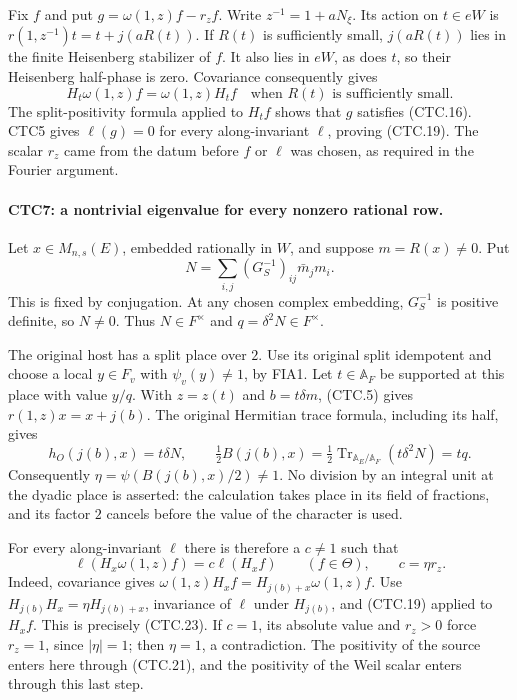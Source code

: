 Fix $f$ and put $g=\omega(1,z)f-r_zf$.  Write
$z^{-1}=1+aN_\xi$.  Its action on $t\in eW$ is
$r(1,z^{-1})t=t+j(aR(t))$.  If $R(t)$ is sufficiently small,
$j(aR(t))$ lies in the finite Heisenberg stabilizer of $f$.
It also lies in $eW$, as does $t$, so their Heisenberg half-phase
is zero.  Covariance consequently gives
\[
 H_t\omega(1,z)f=\omega(1,z)H_tf
                  \quad\text{when }R(t)\text{ is sufficiently small}.
 \tag{CTC.20}
\]
The split-positivity formula applied to $H_tf$ shows that $g$
satisfies (CTC.16).  CTC5 gives $\ell(g)=0$ for every along-invariant
$\ell$, proving (CTC.19).  The scalar $r_z$ came from the datum
before $f$ or $\ell$ was chosen, as required in the Fourier argument.

\paragraph{CTC7: a nontrivial eigenvalue for every nonzero rational row.}
\label{claim:CTC7}
Let $x\in M_{n,s}(E)$, embedded rationally in $W$, and suppose
$m=R(x)\ne0$.  Put
\[
                    N=\sum_{i,j}(G_S^{-1})_{ij}\bar m_jm_i.
 \tag{CTC.21}
\]
This is fixed by conjugation.  At any chosen complex embedding,
$G_S^{-1}$ is positive definite, so $N\ne0$.  Thus $N\in F^\times$
and $q=\delta^2N\in F^\times$.

The original host has a split place over $2$.  Use its original
split idempotent and choose a local $y\in F_v$ with
$\psi_v(y)\ne1$, by FIA1.  Let $t\in\mathbb A_F$ be supported
at this place with value $y/q$.  With $z=z(t)$ and
$b=t\delta m$, (CTC.5) gives $r(1,z)x=x+j(b)$.  The original
Hermitian trace formula, including its half, gives
\[
 h_O(j(b),x)=t\delta N,\qquad
 \tfrac12 B(j(b),x)
   =\tfrac12\operatorname{Tr}_{\mathbb A_E/\mathbb A_F}
                      (t\delta^2N)=tq.
 \tag{CTC.22}
\]
Consequently $\eta=\psi(B(j(b),x)/2)\ne1$.
No division by an integral unit at the dyadic place is asserted:
the calculation takes place in its field of fractions, and its
factor $2$ cancels before the value of the character is used.

For every along-invariant $\ell$ there is therefore a $c\ne1$
such that
\[
 \ell(H_x\omega(1,z)f)=c\ell(H_xf)
                         \qquad(f\in\Theta),\qquad c=\eta r_z.
 \tag{CTC.23}
\]
Indeed, covariance gives
$\omega(1,z)H_xf=H_{j(b)+x}\omega(1,z)f$.
Use $H_{j(b)}H_x=\eta H_{j(b)+x}$, invariance of $\ell$ under
$H_{j(b)}$, and (CTC.19) applied to $H_xf$.  This is precisely
(CTC.23).  If $c=1$, its absolute value and $r_z>0$ force
$r_z=1$, since $|\eta|=1$; then $\eta=1$, a contradiction.
The positivity of the source enters here through (CTC.21), and
the positivity of the Weil scalar enters through this last step.

